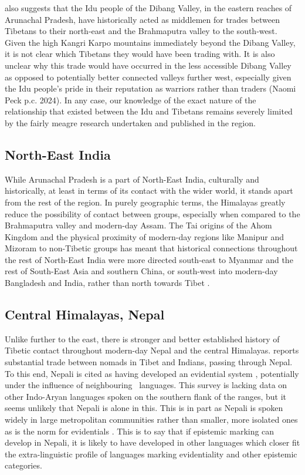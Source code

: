  also suggests that the Idu people of the Dibang Valley, in the eastern reaches of Arunachal Pradesh, have historically acted as middlemen for trades between Tibetans to their north-east and the Brahmaputra valley to the south-west.  Given the high Kangri Karpo mountains immediately beyond the Dibang Valley, it is not clear which Tibetans they would have been trading with. It is also unclear why this trade would have occurred in the less accessible Dibang Valley as opposed to potentially better connected valleys further west, especially given the Idu people's pride in their reputation as warriors rather than traders (Naomi Peck p.c. 2024). In any case, our knowledge of the exact nature of the relationship that existed between the Idu and Tibetans remains severely limited by the fairly meagre research undertaken and published in the region.


\subsection{North-East India}
While Arunachal Pradesh is a part of North-East India, culturally and historically, at least in terms of its contact with the wider world, it stands apart from the rest of the region. In purely geographic terms, the Himalayas greatly reduce the possibility of contact between groups, especially when compared to the Brahmaputra valley and modern-day Assam. The Tai origins of the Ahom Kingdom and the physical proximity of modern-day regions like Manipur and Mizoram to non-Tibetic groups has meant that historical connections throughout the rest of North-East India were more directed south-east to Myanmar and the rest of South-East Asia and southern China, or south-west into modern-day Bangladesh and India, rather than north towards Tibet \cite{Gogoi1968}.

\subsection{Central Himalayas, Nepal}
Unlike further to the east, there is stronger and better established history of Tibetic contact throughout modern-day Nepal and the central Himalayas.  reports substantial trade between nomads in Tibet and Indians, passing through Nepal. To this end, Nepali is cited as having developed an evidential system \cite{Bashir2006}, potentially under the influence of neighbouring \lfam\ languages. This survey is lacking data on other Indo-Aryan languages spoken on the southern flank of the ranges, but it seems unlikely that Nepali is alone in this. This is in part as Nepali is spoken widely in large metropolitan communities rather than smaller, more isolated ones as is the norm for evidentials \cite[359]{Aikhenvald2004}. This is to say that if epistemic marking can develop in Nepali, it is likely to have developed in other languages which closer fit the extra-linguistic profile of languages marking evidentiality and other epistemic categories.

